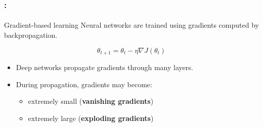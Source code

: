 \documentclass[xcolor=table]{beamer}
\begin{document}
\begin{frame}
	\frametitle{\insertshortsubtitle: \insertsection}
	\framesubtitle{\insertsubsection}
	
	\begin{block}{Gradient-based learning}
		Neural networks are trained using gradients computed by backpropagation.
	\end{block}
	
	\vspace{0.3cm}
	
	\begin{equation*}
		\theta_{t+1}
		=
		\theta_t
		-
		\eta
		\nabla J(\theta_t)
	\end{equation*}
	
	\vspace{0.3cm}
	
	\begin{itemize}
		\item Deep networks propagate gradients through many layers.
		\item During propagation, gradients may become:
		\begin{itemize}
			\item extremely small (\textbf{vanishing gradients})
			\item extremely large (\textbf{exploding gradients})
		\end{itemize}
	\end{itemize}
	
\end{frame}
\end{document}
